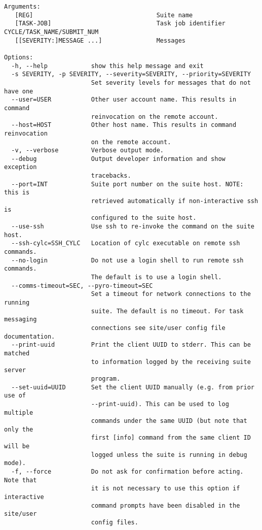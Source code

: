 \begin{lstlisting}
Arguments:
   [REG]                                  Suite name
   [TASK-JOB]                             Task job identifier CYCLE/TASK_NAME/SUBMIT_NUM
   [[SEVERITY:]MESSAGE ...]               Messages

Options:
  -h, --help            show this help message and exit
  -s SEVERITY, -p SEVERITY, --severity=SEVERITY, --priority=SEVERITY
                        Set severity levels for messages that do not have one
  --user=USER           Other user account name. This results in command
                        reinvocation on the remote account.
  --host=HOST           Other host name. This results in command reinvocation
                        on the remote account.
  -v, --verbose         Verbose output mode.
  --debug               Output developer information and show exception
                        tracebacks.
  --port=INT            Suite port number on the suite host. NOTE: this is
                        retrieved automatically if non-interactive ssh is
                        configured to the suite host.
  --use-ssh             Use ssh to re-invoke the command on the suite host.
  --ssh-cylc=SSH_CYLC   Location of cylc executable on remote ssh commands.
  --no-login            Do not use a login shell to run remote ssh commands.
                        The default is to use a login shell.
  --comms-timeout=SEC, --pyro-timeout=SEC
                        Set a timeout for network connections to the running
                        suite. The default is no timeout. For task messaging
                        connections see site/user config file documentation.
  --print-uuid          Print the client UUID to stderr. This can be matched
                        to information logged by the receiving suite server
                        program.
  --set-uuid=UUID       Set the client UUID manually (e.g. from prior use of
                        --print-uuid). This can be used to log multiple
                        commands under the same UUID (but note that only the
                        first [info] command from the same client ID will be
                        logged unless the suite is running in debug mode).
  -f, --force           Do not ask for confirmation before acting. Note that
                        it is not necessary to use this option if interactive
                        command prompts have been disabled in the site/user
                        config files.
\end{lstlisting}
